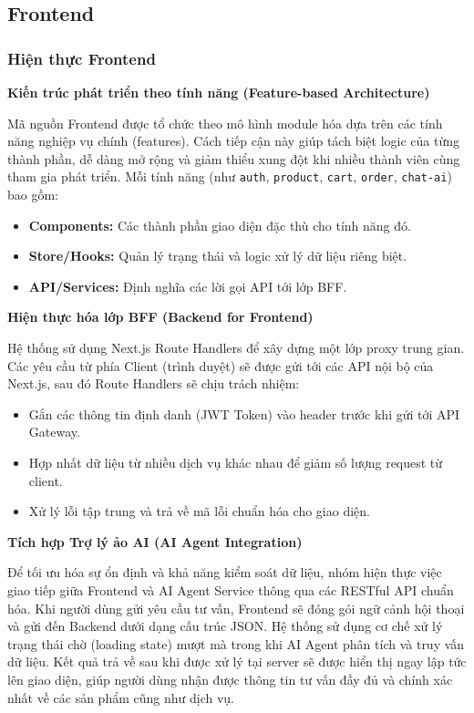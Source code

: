 \subsection{Frontend}

\subsubsection{Hiện thực Frontend}

\textbf{Kiến trúc phát triển theo tính năng (Feature-based Architecture)}

Mã nguồn Frontend được tổ chức theo mô hình module hóa dựa trên các tính năng nghiệp vụ chính (features). Cách tiếp cận này giúp tách biệt logic của từng thành phần, dễ dàng mở rộng và giảm thiểu xung đột khi nhiều thành viên cùng tham gia phát triển. Mỗi tính năng (như \texttt{auth}, \texttt{product}, \texttt{cart}, \texttt{order}, \texttt{chat-ai}) bao gồm:
\begin{itemize}
    \item \textbf{Components:} Các thành phần giao diện đặc thù cho tính năng đó.
    \item \textbf{Store/Hooks:} Quản lý trạng thái và logic xử lý dữ liệu riêng biệt.
    \item \textbf{API/Services:} Định nghĩa các lời gọi API tới lớp BFF.
\end{itemize}

\textbf{Hiện thực hóa lớp BFF (Backend for Frontend)}

Hệ thống sử dụng Next.js Route Handlers để xây dựng một lớp proxy trung gian. Các yêu cầu từ phía Client (trình duyệt) sẽ được gửi tới các API nội bộ của Next.js, sau đó Route Handlers sẽ chịu trách nhiệm:
\begin{itemize}
    \item Gắn các thông tin định danh (JWT Token) vào header trước khi gửi tới API Gateway.
    \item Hợp nhất dữ liệu từ nhiều dịch vụ khác nhau để giảm số lượng request từ client.
    \item Xử lý lỗi tập trung và trả về mã lỗi chuẩn hóa cho giao diện.
\end{itemize}

\textbf{Tích hợp Trợ lý ảo AI (AI Agent Integration)}

Để tối ưu hóa sự ổn định và khả năng kiểm soát dữ liệu, nhóm hiện thực việc giao tiếp giữa Frontend và AI Agent Service thông qua các RESTful API chuẩn hóa. Khi người dùng gửi yêu cầu tư vấn, Frontend sẽ đóng gói ngữ cảnh hội thoại và gửi đến Backend dưới dạng cấu trúc JSON. Hệ thống sử dụng cơ chế xử lý trạng thái chờ (loading state) mượt mà trong khi AI Agent phân tích và truy vấn dữ liệu. Kết quả trả về sau khi được xử lý tại server sẽ được hiển thị ngay lập tức lên giao diện, giúp người dùng nhận được thông tin tư vấn đầy đủ và chính xác nhất về các sản phẩm cũng như dịch vụ.

